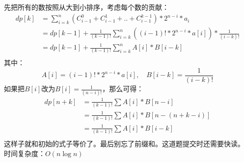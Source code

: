 先把所有的数按照从大到小排序，考虑每个数的贡献：
$$
\begin{aligned}
dp[k]&=\sum_{i=k}^{n}(C_{i-1}^{0} + C_{i-1}^{1}+..+C_{i-1}^{k-1})*2^{n-i}*a_i \\
&=dp[k-1]+\frac{1}{(k-1)!}\sum_{i=k}^{n}((i-1)!*2^{n-i}*a[i])*\frac{1}{(i-k)!} \\
&=dp[k-1]+\frac{1}{(k-1)!}\sum_{i=k}^{n}A[i]*B[i-k]\\
\end{aligned}
$$
其中：
$$
A[i]=(i-1)!*2^{n-i}*a[i],\quad B[i-k]=\frac{1}{(i-k)!}
$$
如果把$B[i]$改为$B[i]=\frac{1}{(n-i)!}$，那么可得：
$$
\begin{aligned}
dp[n+k]&=\frac{1}{(k-1)!}\sum A[i]*B[n-i] \\
&=\frac{1}{(k-1)!}\sum A[i]*B[n-(n+k-i)] \\
&=\frac{1}{(k-1)!}\sum A[i]*B[i-k] \\
\end{aligned}
$$
这样子就和初始的式子等价了。最后别忘了前缀和。这道题提交时还需要快读。\\
时间复杂度：$O(n\log n)$
